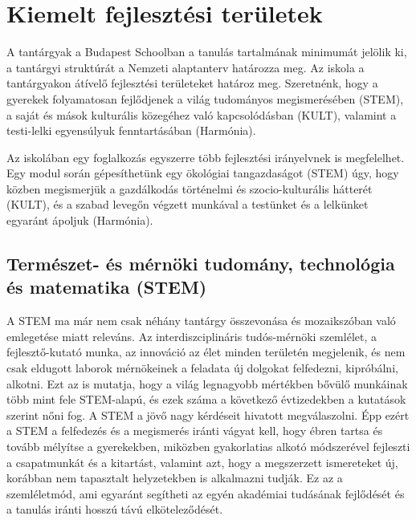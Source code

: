 \hypertarget{kiemelt-fejlesztesi-teruletek}{%
\section{Kiemelt fejlesztési
területek}\label{kiemelt-fejlesztesi-teruletek}}

A tantárgyak a Budapest Schoolban a tanulás tartalmának minimumát
jelölik ki, a tantárgyi struktúrát a Nemzeti alaptanterv határozza meg.
Az iskola a tantárgyakon átívelő fejlesztési területeket határoz meg.
Szeretnénk, hogy a gyerekek folyamatosan fejlődjenek a világ tudományos
megismerésében (STEM), a saját és mások kulturális közegéhez való
kapcsolódásban (KULT), valamint a testi-lelki egyensúlyuk fenntartásában
(Harmónia).

Az iskolában egy foglalkozás egyszerre több fejlesztési irányelvnek is
megfelelhet. Egy modul során gépesíthetünk egy ökológiai
tangazdaságot (STEM) úgy, hogy közben megismerjük a gazdálkodás történelmi
és szocio-kulturális hátterét (KULT), és a szabad levegőn végzett
munkával a testünket és a lelkünket egyaránt ápoljuk (Harmónia).

\hypertarget{termeszet--es-mernoki-tudomany-technologia-es-matematika-stem}{%
\subsection{Természet- és mérnöki tudomány, technológia és matematika
(STEM)}\label{termeszet--es-mernoki-tudomany-technologia-es-matematika-stem}}

A STEM ma már nem csak néhány tantárgy összevonása és mozaikszóban való
emlegetése miatt releváns. Az interdiszciplináris tudós-mérnöki
szemlélet, a fejlesztő-kutató munka, az innováció az élet minden
területén megjelenik, és nem csak eldugott laborok mérnökeinek a
feladata új dolgokat felfedezni, kipróbálni, alkotni. Ezt az is mutatja,
hogy a világ legnagyobb mértékben bővülő munkáinak több mint fele
STEM-alapú, és ezek száma a következő évtizedekben a kutatások szerint
nőni fog. A STEM a jövő nagy kérdéseit hivatott megválaszolni. Épp ezért
a STEM a felfedezés és a megismerés iránti vágyat kell, hogy ébren
tartsa és tovább mélyítse a gyerekekben, miközben gyakorlatias alkotó
módszerével fejleszti a csapatmunkát és a kitartást, valamint azt, hogy
a megszerzett ismereteket új, korábban nem tapasztalt helyzetekben is
alkalmazni tudják. Ez az a szemléletmód, ami egyaránt segítheti az egyén
akadémiai tudásának fejlődését és a tanulás iránti hosszú távú
elköteleződését.

